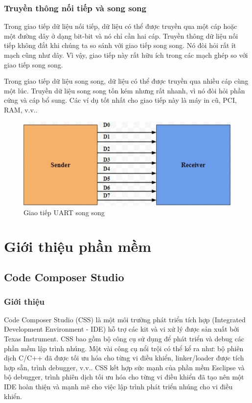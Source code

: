 \subsubsection{Truyền thông nối tiếp và song song}
Trong giao tiếp dữ liệu nối tiếp, dữ liệu có thể được truyền qua một cáp hoặc một đường dây ở dạng bit-bit và nó chỉ cần hai cáp.
Truyền thông dữ liệu nối tiếp không đắt khi chúng ta so sánh với giao tiếp song song.
Nó đòi hỏi rất ít mạch cũng như dây.
Vì vậy, giao tiếp này rất hữu ích trong các mạch ghép so với giao tiếp song song.

Trong giao tiếp dữ liệu song song, dữ liệu có thể được truyền qua nhiều cáp cùng một lúc.
Truyền dữ liệu song song tốn kém nhưng rất nhanh, vì nó đòi hỏi phần cứng và cáp bổ sung.
Các ví dụ tốt nhất cho giao tiếp này là máy in cũ, PCI, RAM, v.v..

\begin{figure}[ht]
\centering
\includegraphics[scale=0.5]{images/UART_parallel.png}
\caption{Giao tiếp UART song song}
\end{figure}

\section{Giới thiệu phần mềm}
\subsection{Code Composer Studio}
\subsubsection{Giới thiệu}
Code Composer Studio (CSS) là một môi trường phát triển tích hợp (Integrated Đevelopment Environment - IDE)
hỗ trợ các kit và vi xử lý được sản xuất bởi Texas Instrument.
CSS bao gồm bộ công cụ sử dụng để phát triển và debug các phần mềm lập trình nhúng.
Một vài công cụ nổi trội có thể kể ra như: bộ phiên dịch C/C++ đã được tối ưu hóa cho từng vi điều khiển,
linker/loader được tích hợp sẵn, trình debugger, v.v..
CSS kết hợp sức mạnh của phần mềm Esclipse và bộ debugger, trình phiên dịch tối ưu hóa cho từng vi điều khiển
đã tạo nên một IDE hoàn thiện và mạnh mẽ cho việc lập trình phát triển nhúng cho vi điều khiển.

